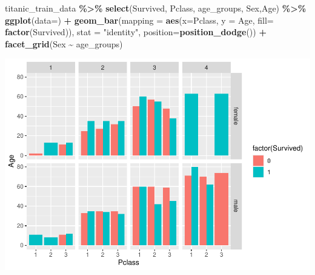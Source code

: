 \documentclass[
]{article}
\newenvironment{Shaded}{\begin{snugshade}}{\end{snugshade}}
\newcommand{\AttributeTok}[1]{\textcolor[rgb]{0.13,0.29,0.53}{#1}}
\newcommand{\CommentTok}[1]{\textcolor[rgb]{0.56,0.35,0.01}{\textit{#1}}}
\newcommand{\ConstantTok}[1]{\textcolor[rgb]{0.56,0.35,0.01}{#1}}
\newcommand{\FunctionTok}[1]{\textcolor[rgb]{0.13,0.29,0.53}{\textbf{#1}}}
\newcommand{\NormalTok}[1]{#1}
\newcommand{\OtherTok}[1]{\textcolor[rgb]{0.56,0.35,0.01}{#1}}
\newcommand{\SpecialCharTok}[1]{\textcolor[rgb]{0.81,0.36,0.00}{\textbf{#1}}}
\newcommand{\StringTok}[1]{\textcolor[rgb]{0.31,0.60,0.02}{#1}}
\begin{document}
\begin{Shaded}
\begin{Highlighting}[]
\NormalTok{titanic\_train\_data }\SpecialCharTok{\%\textgreater{}\%}
  \FunctionTok{select}\NormalTok{(Survived, Pclass, age\_groups, Sex,Age) }\SpecialCharTok{\%\textgreater{}\%}
  \FunctionTok{ggplot}\NormalTok{(}\AttributeTok{data=}\NormalTok{) }\SpecialCharTok{+} 
  \FunctionTok{geom\_bar}\NormalTok{(}\AttributeTok{mapping =}  \FunctionTok{aes}\NormalTok{(}\AttributeTok{x=}\NormalTok{Pclass, }\AttributeTok{y =}\NormalTok{ Age, }\AttributeTok{fill=} \FunctionTok{factor}\NormalTok{(Survived)), }\AttributeTok{stat =} \StringTok{"identity"}\NormalTok{,  }\AttributeTok{position=}\FunctionTok{position\_dodge}\NormalTok{()) }\SpecialCharTok{+}
  \FunctionTok{facet\_grid}\NormalTok{(Sex }\SpecialCharTok{\textasciitilde{}}\NormalTok{ age\_groups)}
\end{Highlighting}
\end{Shaded}

\includegraphics{Titanic-Documentation_files/figure-latex/unnamed-chunk-37-1.pdf}

\begin{Shaded}
\end{Shaded}
\end{document}
